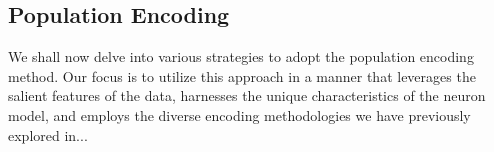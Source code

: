 \subsection{Population Encoding}

We shall now delve into various strategies to adopt the population encoding method. Our focus is to utilize this approach in a manner that leverages the salient features of the data, harnesses the unique characteristics of the neuron model, and employs the diverse encoding methodologies we have previously explored in...
